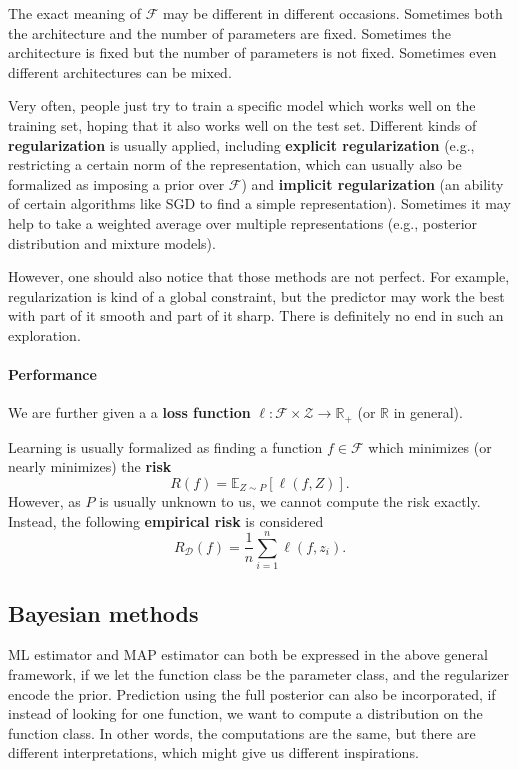 \documentclass[openany]{book}
\theoremstyle{definition}
\theoremstyle{remark}
\begin{document}
The exact meaning of $\mathcal{F}$ may be different in different occasions. Sometimes both the architecture and the number of parameters are fixed. Sometimes the architecture is fixed but the number of parameters is not fixed. Sometimes even different architectures can be mixed.

Very often, people just try to train a specific model which works well on the training set, hoping that it also works well on the test set. Different kinds of \textbf{regularization} is usually applied, including \textbf{explicit regularization} (e.g., restricting a certain norm of the representation, which can usually also be formalized as imposing a prior over $\mathcal{F}$) and \textbf{implicit regularization} (an ability of certain algorithms like SGD to find a simple representation). Sometimes it may help to take a weighted average over multiple representations (e.g., posterior distribution and mixture models).

However, one should also notice that those methods are not perfect. For example, regularization is kind of a global constraint, but the predictor may work the best with part of it smooth and part of it sharp. There is definitely no end in such an exploration.

\paragraph{Performance}
We are further given a a \textbf{loss function} $\ell:\mathcal{F}\times \mathcal{Z}\to \mathbb{R}_+$ (or $\mathbb{R}$ in general).

Learning is usually formalized as finding a function $f\in \mathcal{F}$ which minimizes (or nearly minimizes) the \textbf{risk}
\begin{equation}\label{risk}
    R(f)=\mathbb{E}_{Z\sim P}\left[\ell(f,Z)\right].
\end{equation}
However, as $P$ is usually unknown to us, we cannot compute the risk exactly. Instead, the following \textbf{empirical risk} is considered
\begin{equation}\label{empRisk}
    R_{\mathcal{D}}(f)=\frac{1}{n}\sum_{i=1}^{n}\ell(f,z_i).
\end{equation}

\subsection{Bayesian methods}
ML estimator and MAP estimator can both be expressed in the above general framework, if we let the function class be the parameter class, and the regularizer encode the prior. Prediction using the full posterior can also be incorporated, if instead of looking for one function, we want to compute a distribution on the function class. In other words, the computations are the same, but there are different interpretations, which might give us different inspirations.
\end{document}
